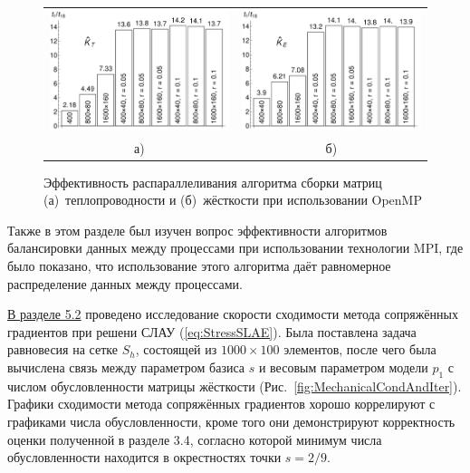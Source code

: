 \begin{figure}[ht] \centering
	\begin{tabular}{cc}
		\includegraphics[width=0.4\linewidth]{pics/OMPThermal.pdf} &
		\includegraphics[width=0.4\linewidth]{pics/OMPMechanical.pdf} \\
		а) & б)
	\end{tabular}
    \caption{Эффективность распараллеливания алгоритма сборки матриц (а)~теплопроводности и (б)~жёсткости при использовании OpenMP}
    \label{fig:OMPParallelization}
\end{figure}

Также в этом разделе был изучен вопрос эффективности алгоритмов балансировки данных между процессами при использовании технологии MPI, где было показано, что использование этого алгоритма даёт равномерное распределение данных между процессами.

\underline{В разделе 5.2} проведено исследование скорости сходимости метода сопряжённых градиентов при решени СЛАУ (\ref{eq:StressSLAE}). Была поставлена задача равновесия на сетке $S_h$, состоящей из $1000 \times 100$ элементов, после чего была вычислена связь между параметром базиса $s$ и весовым параметром модели $p_1$ с числом обусловленности матрицы жёсткости (Рис.~\ref{fig:MechanicalCondAndIter}). Графики сходимости метода сопряжённых градиентов хорошо коррелируют с графиками числа обусловленности, кроме того они демонстрируют корректность оценки полученной в разделе 3.4, согласно которой минимум числа обусловленности находится в окрестностях точки $s = 2/9$.

